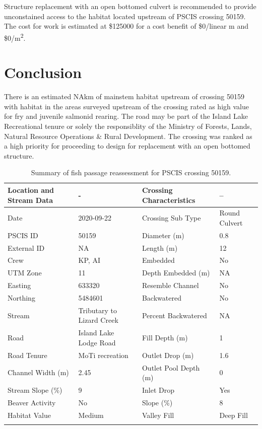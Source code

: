 \documentclass[
]{book}
\begin{document}
Structure replacement with an open bottomed culvert is recommended to provide unconstained access to the habitat located upstream of PSCIS crossing 50159. The cost for work is estimated at \$125000 for a cost benefit of \$0/linear m and \$0/m\textsuperscript{2}.

\hypertarget{conclusion-2}{%
\section*{Conclusion}\label{conclusion-2}}

There is an estimated NAkm of mainstem habitat upstream of crossing 50159 with habitat in the areas surveyed upstream of the crossing rated as high value for fry and juvenile salmonid rearing. The road may be part of the Island Lake Recreational tenure or solely the responsiblity of the Ministry of Forests, Lands, Natural Resource Operations \& Rural Development. The crossing was ranked as a high priority for proceeding to design for replacement with an open bottomed structure.

\begin{table}

\caption{\label{tab:tab-culvert-020}Summary of fish passage reassessment for PSCIS crossing 50159.}
\centering
\fontsize{11}{13}\selectfont
\begin{tabu} to 
\hline
Location and Stream Data & - & Crossing Characteristics & --\\
\hline
Date & 2020-09-22 & Crossing Sub Type & Round Culvert\\
\hline
PSCIS ID & 50159 & Diameter (m) & 0.8\\
\hline
External ID & NA & Length (m) & 12\\
\hline
Crew & KP, AI & Embedded & No\\
\hline
UTM Zone & 11 & Depth Embedded (m) & NA\\
\hline
Easting & 633320 & Resemble Channel & No\\
\hline
Northing & 5484601 & Backwatered & No\\
\hline
Stream & Tributary to Lizard Creek & Percent Backwatered & NA\\
\hline
Road & Island Lake Lodge Road & Fill Depth (m) & 1\\
\hline
Road Tenure & MoTi recreation & Outlet Drop (m) & 1.6\\
\hline
Channel Width (m) & 2.45 & Outlet Pool Depth (m) & 0\\
\hline
Stream Slope (\%) & 9 & Inlet Drop & Yes\\
\hline
Beaver Activity & No & Slope (\%) & 8\\
\hline
Habitat Value & Medium & Valley Fill & Deep Fill\\
\hline
{}\\
\end{tabu}
\end{table}
\end{document}
